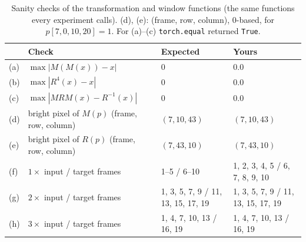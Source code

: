 \begin{table}[H]\centering\small
\caption{Sanity checks of the transformation and window functions (the same functions every experiment calls). (d), (e): (frame, row, column), 0-based, for $p[7,0,10,20]=1$. For (a)--(c) \texttt{torch.equal} returned \texttt{True}.}\label{tab:t1}
\begin{tabular}{llll}\toprule
 & Check & Expected & Yours \\ \midrule
(a) & $\max|M(M(x))-x|$ & 0 & 0.0 \\
(b) & $\max|R^{4}(x)-x|$ & 0 & 0.0 \\
(c) & $\max|MRM(x)-R^{-1}(x)|$ & 0 & 0.0 \\
(d) & bright pixel of $M(p)$ (frame, row, column) & $(7,10,43)$ & $(7, 10, 43)$ \\
(e) & bright pixel of $R(p)$ (frame, row, column) & $(7,43,10)$ & $(7, 43, 10)$ \\ \midrule
(f) & $1\times$ input / target frames & 1--5 / 6--10 & 1, 2, 3, 4, 5 / 6, 7, 8, 9, 10 \\
(g) & $2\times$ input / target frames & 1, 3, 5, 7, 9 / 11, 13, 15, 17, 19 & 1, 3, 5, 7, 9 / 11, 13, 15, 17, 19 \\
(h) & $3\times$ input / target frames & 1, 4, 7, 10, 13 / 16, 19 & 1, 4, 7, 10, 13 / 16, 19 \\
\bottomrule\end{tabular}
\end{table}